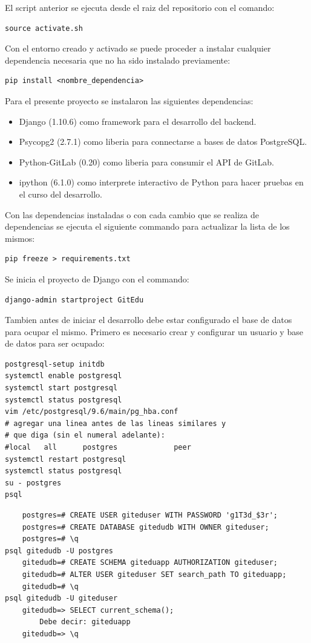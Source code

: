 El script anterior se ejecuta desde el raiz del repositorio con el comando:

\begin{lstlisting}
source activate.sh
\end{lstlisting}

Con el entorno creado y activado se puede proceder a instalar cualquier dependencia necesaria que no ha sido instalado previamente:

\begin{lstlisting}
pip install <nombre_dependencia>
\end{lstlisting}

Para el presente proyecto se instalaron las siguientes dependencias:
\begin{itemize}
	\item Django (1.10.6) como framework para el desarrollo del backend.
    \item Psycopg2 (2.7.1) como liberia para connectarse a bases de datos PostgreSQL.
    \item Python-GitLab (0.20) como liberia para consumir el API de GitLab.
    \item ipython (6.1.0) como interprete interactivo de Python para hacer pruebas en el curso del desarrollo.
\end{itemize}

Con las dependencias instaladas o con cada cambio que se realiza de dependencias se ejecuta el siguiente commando para actualizar la lista de los mismos:

\begin{lstlisting}
pip freeze > requirements.txt
\end{lstlisting}

Se inicia el proyecto de Django con el commando:

\begin{lstlisting}
django-admin startproject GitEdu
\end{lstlisting}

Tambien antes de iniciar el desarrollo debe estar configurado el base de datos para ocupar el mismo. Primero es necesario crear y configurar un usuario y base de datos para ser ocupado:
\begin{lstlisting}
postgresql-setup initdb
systemctl enable postgresql
systemctl start postgresql
systemctl status postgresql
vim /etc/postgresql/9.6/main/pg_hba.conf
# agregar una linea antes de las lineas similares y
# que diga (sin el numeral adelante):
#local   all      postgres             peer
systemctl restart postgresql
systemctl status postgresql
su - postgres
psql
\end{lstlisting}
\begin{lstlisting}
	postgres=# CREATE USER giteduser WITH PASSWORD 'g1T3d_$3r';
	postgres=# CREATE DATABASE gitedudb WITH OWNER giteduser;
	postgres=# \q
psql gitedudb -U postgres
	gitedudb=# CREATE SCHEMA giteduapp AUTHORIZATION giteduser;
	gitedudb=# ALTER USER giteduser SET search_path TO giteduapp;
	gitedudb=# \q
psql gitedudb -U giteduser
	gitedudb=> SELECT current_schema();
		Debe decir: giteduapp
	gitedudb=> \q
\end{lstlisting}

